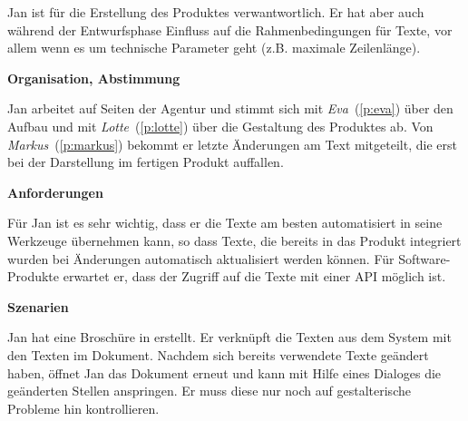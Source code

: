 \begin{multicols}{2}

\begin{center}
\end{center}


Jan ist für die Erstellung des Produktes verwantwortlich. Er hat aber auch während der Entwurfsphase Einfluss auf die Rahmenbedingungen für Texte, vor allem wenn es um technische Parameter geht (z.B. maximale Zeilenlänge).

\textbf{Organisation, Abstimmung}

Jan arbeitet auf Seiten der Agentur und stimmt sich mit \emph{Eva}~(\ref{p:eva}) über den Aufbau und mit \emph{Lotte}~(\ref{p:lotte}) über die Gestaltung des Produktes ab. Von \emph{Markus}~(\ref{p:markus}) bekommt er letzte Änderungen am Text mitgeteilt, die erst bei der Darstellung im fertigen Produkt auffallen.

\textbf{Anforderungen}

Für Jan ist es sehr wichtig, dass er die Texte am besten automatisiert in seine Werkzeuge übernehmen kann, so dass Texte, die bereits in das Produkt integriert wurden bei Änderungen automatisch aktualisiert werden können. Für Software-Produkte erwartet er, dass der Zugriff auf die Texte mit einer API möglich ist.

\columnbreak

\textbf{Szenarien}

Jan hat eine Broschüre in  erstellt. Er verknüpft die Texten aus dem System mit den Texten im Dokument. Nachdem sich bereits verwendete Texte geändert haben, öffnet Jan das Dokument erneut und kann mit Hilfe eines Dialoges die geänderten Stellen anspringen. Er muss diese nur noch auf gestalterische Probleme hin kontrollieren.


\end{multicols}
